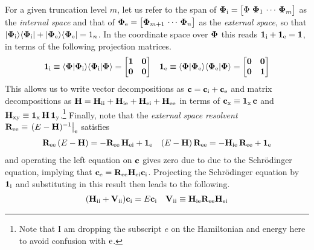 \documentclass[11pt]{article}
\numberwithin{equation}{section}
\begin{document}
\begin{rmk}
\label{rmk:lowdin-partitioning}
For a given truncation level $m$, let us refer to the span of
$\bm{\F}_\mr{i}=\pma{\F\ \bm{\F}_1\,\cd\,\bm{\F}_m}$
as the
\textit{internal space}
and that of
$\bm{\F}_\mr{e}=\pma{\bm{\F}_{m+1}\,\cd\,\bm{\F}_n}$
as the
\textit{external space}, so that
$
  |\mathbf{\Phi }_{\mathrm{i}}\rangle
  \langle\mathbf{\Phi }_{\mathrm{i}}|
+
  |\mathbf{\Phi }_{\mathrm{e}}\rangle
  \langle\mathbf{\Phi }_{\mathrm{e}}|
=
  1_n
$.
In the coordinate space over $\mathbf{\Phi }$ this reads
$
  \mathbf{1}_{\mathrm{i}}
+
  \mathbf{1}_{\mathrm{e}}
=
  \mathbf{1}
$,
in terms of the following projection matrices.
\begin{align}
  \bo{1}_\mr{i}
\equiv
  \ip{\bo{\F}|\bo{\F}_\mr{i}}
  \ip{\bo{\F}_\mr{i}|\bo{\F}}
=
\pma[l]{
  \bo{1} & \bo{0} \\
  \bo{0} & \bo{0}
}
&&
  \bo{1}_\mr{e}
\equiv
  \ip{\bo{\F}|\bo{\F}_\mr{e}}
  \ip{\bo{\F}_\mr{e}|\bo{\F}}
=
\pma[l]{
  \bo{0} & \bo{0} \\
  \bo{0} & \bo{1}
}
\end{align}
This allows us to write vector decompositions as
$
  \mathbf{c}
=
  \mathbf{c}_{\mathrm{i}}
+
  \mathbf{c}_{\mathrm{e}}
$
and matrix decompositions as
$
  \mathbf{H}
=
  \mathbf{H}_{\mathrm{ii}}
+
  \mathbf{H}_{\mathrm{ie}}
+
  \mathbf{H}_{\mathrm{ei}}
+
  \mathbf{H}_{\mathrm{ee}}
$
in terms of
$
  \mathbf{c}_{\mathrm{x}}
\equiv
  \mathbf{1}_{\mathrm{x}}\,
  \mathbf{c}
$
and
$
  \mathbf{H}_{\mathrm{xy}}
\equiv
  \mathbf{1}_{\mathrm{x}}\,
  \mathbf{H}\,
  \mathbf{1}_{\mathrm{y}}
$.\footnote{Note that I am dropping the subscript $e$ on the Hamiltonian and energy here to avoid confusion with $\mathrm{e}$.}
Finally, note that the \textit{external space resolvent}
$
  \mathbf{R}_{\mathrm{ee}}
\equiv
\left.
  (
    E
  -
    \mathbf{H}
  )^{-1}
\right|_{\mathrm{e}}
$
satisfies
\begin{align}
  \mathbf{R}_{\mathrm{ee}}\,
  (
    E
  -
    \mathbf{H}
  )
=
-
  \mathbf{R}_{\mathrm{ee}}\,
  \mathbf{H}_{\mathrm{ei}}
+
  \mathbf{1}_{\mathrm{e}}
&&
  (
    E
  -
    \mathbf{H}
  )\,
  \mathbf{R}_{\mathrm{ee}}
=
-
  \mathbf{H}_{\mathrm{ie}}\,
  \mathbf{R}_{\mathrm{ee}}
+
  \mathbf{1}_{\mathrm{e}}
\end{align}
and operating the left equation on $\mathbf{c}$ gives zero due to due to the Schr\"odinger equation, implying that
$
  \mathbf{c}_{\mathrm{e}}
=
  \mathbf{R}_{\mathrm{ee}}
  \mathbf{H}_{\mathrm{ei}}
  \mathbf{c}_{\mathrm{i}}
$.
Projecting the Schr\"odinger equation by $\mathbf{1}_{\mathrm{i}}$ and substituting in this result then leads to the following.
\begin{align}
  (
    \mathbf{H}_{\mathrm{ii}}
  +
    \mathbf{V}_{\mathrm{ii}}
  )
  \mathbf{c}_{\mathrm{i}}
=
  E
  \mathbf{c}_{\mathrm{i}}
&&
  \mathbf{V}_{\mathrm{ii}}
\equiv
  \mathbf{H}_{\mathrm{ie}}
  \mathbf{R}_{\mathrm{ee}}
  \mathbf{H}_{\mathrm{ei}}
\end{align}

\end{rmk}
\end{document}
